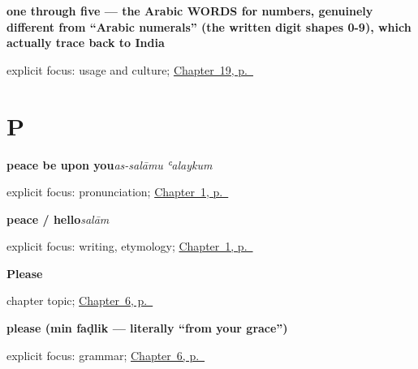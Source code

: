 \noindent\begin{minipage}[t]{\linewidth}
\raggedright
\textbf{one through five — the Arabic WORDS for numbers, genuinely different from \textquotedblleft{}Arabic numerals\textquotedblright{} (the written digit shapes 0-9), which actually trace back to India}\enspace\emph{    }\par
\footnotesize explicit focus: usage and culture; \hyperref[ch:ar-numbers-one-to-five]{Chapter~19, p.~\pageref*{ch:ar-numbers-one-to-five}}
\end{minipage}\par\smallskip

\section*{P}

\noindent\begin{minipage}[t]{\linewidth}
\raggedright
\textbf{peace be upon you}\enspace\emph{as-salāmu ʿalaykum}\par
\footnotesize explicit focus: pronunciation; \hyperref[ch:greetings]{Chapter~1, p.~\pageref*{ch:greetings}}
\end{minipage}\par\smallskip

\noindent\begin{minipage}[t]{\linewidth}
\raggedright
\textbf{peace / hello}\enspace\emph{salām}\par
\footnotesize explicit focus: writing, etymology; \hyperref[ch:greetings]{Chapter~1, p.~\pageref*{ch:greetings}}
\end{minipage}\par\smallskip

\noindent\begin{minipage}[t]{\linewidth}
\raggedright
\textbf{Please}\par
\footnotesize chapter topic; \hyperref[ch:ar-please]{Chapter~6, p.~\pageref*{ch:ar-please}}
\end{minipage}\par\smallskip

\noindent\begin{minipage}[t]{\linewidth}
\raggedright
\textbf{please (min faḍlik — literally \textquotedblleft{}from your grace\textquotedblright{})}\enspace\emph{ }\par
\footnotesize explicit focus: grammar; \hyperref[ch:ar-please]{Chapter~6, p.~\pageref*{ch:ar-please}}
\end{minipage}\par\smallskip

